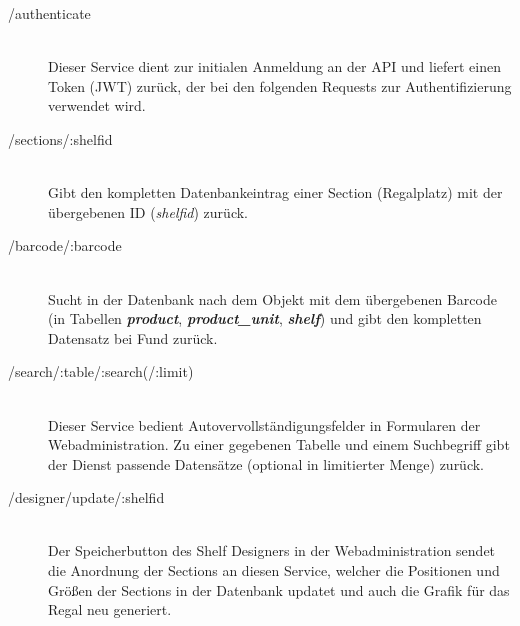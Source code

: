 \begin{description}
  \item[/authenticate] \hfill \\
    Dieser Service dient zur initialen Anmeldung an der \acs{API} und liefert einen Token (\acs{JWT}) zurück, der bei den folgenden Requests zur Authentifizierung verwendet wird.
  \item[/sections/:shelfid] \hfill \\
    Gibt den kompletten Datenbankeintrag einer Section (Regalplatz) mit der übergebenen ID (\emph{shelfid}) zurück.
  \item[/barcode/:barcode] \hfill \\
    Sucht in der Datenbank nach dem Objekt mit dem übergebenen Barcode (in Tabellen \textit{\textbf{product}}, \textit{\textbf{product\_unit}}, \textit{\textbf{shelf}}) und gibt den kompletten Datensatz bei Fund zurück.
  \item[/search/:table/:search(/:limit)] \hfill \\
    Dieser Service bedient Autovervollständigungsfelder in Formularen der Webadministration. Zu einer gegebenen Tabelle und einem Suchbegriff gibt der Dienst passende Datensätze (optional in limitierter Menge) zurück.
  \item[/designer/update/:shelfid] \hfill \\
    Der Speicherbutton des Shelf Designers in der Webadministration sendet die Anordnung der Sections an diesen Service, welcher die Positionen und Größen der Sections in der Datenbank updatet und auch die Grafik für das Regal neu generiert.
\end{description}
